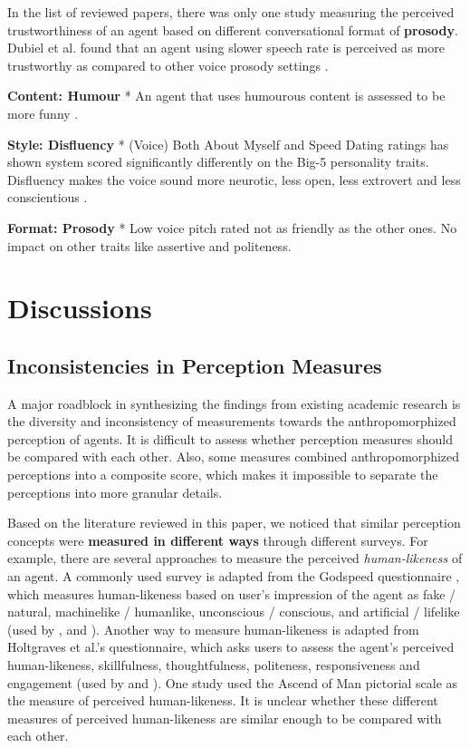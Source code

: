\documentclass[sigconf,screen,review, anonymous]{acmart}
\newcommand{\cmt}[1]{}%
\begin{document}
In the list of reviewed papers, there was only one study measuring the perceived trustworthiness of an agent based on different conversational format of \textbf{prosody}. Dubiel et al. found that an agent using slower speech rate is perceived as more trustworthy as compared to other voice prosody settings \cite{dubiel2020persuasive}\cmt{[60]}.

\textbf{Content: Humour}
* An agent that uses humourous content is assessed to be more funny \cite{khooshabeh2011does}\cmt{[37]}.

\textbf{Style: Disfluency}
* (Voice) Both About Myself and Speed Dating ratings has shown system scored significantly differently on the Big-5 personality traits. Disfluency makes the voice sound more neurotic, less open, less extrovert and less conscientious \cite{wester2015artificial}\cmt{[14]}.

\textbf{Format: Prosody}
* Low voice pitch rated not as friendly as the other ones. No impact on other traits like assertive and politeness. \cite{cambre2019one}\cmt{[62]}

\section{Discussions}

\subsection{Inconsistencies in Perception Measures}

A major roadblock in synthesizing the findings from existing academic research is the diversity and inconsistency of measurements towards the anthropomorphized perception of agents. It is difficult to assess whether perception measures should be compared with each other. Also, some measures combined anthropomorphized perceptions into a composite score, which makes it impossible to separate the perceptions into more granular details.

Based on the literature reviewed in this paper, we noticed that similar perception concepts were \textbf{measured in different ways} through different surveys. For example, there are several approaches to measure the perceived \textit{human-likeness} of an agent. A commonly used survey is adapted from the Godspeed questionnaire \cite{bartneck2009measurement}, which measures human-likeness based on user's impression of the agent as fake / natural, machinelike / humanlike, unconscious / conscious, and artificial / lifelike (used by \cite{hoegen2019end}\cmt{[31]}, \cite{jeong2019exploring}\cmt{[10]} and \cite{ouchi2019should}\cmt{[59]}). Another way to measure human-likeness is adapted from Holtgraves et al.'s \cite{holtgraves2007perceiving} questionnaire, which asks users to assess the agent's perceived human-likeness, skillfulness, thoughtfulness, politeness, responsiveness and engagement (used by \cite{diederich2019emulating}\cmt{[25]} and  \cite{gnewuch2018faster}\cmt{[19]}). One study \cite{westerman2019believe}\cmt{[9]} used the Ascend of Man pictorial scale \cite{kteily2015ascent} as the measure of perceived human-likeness. It is unclear whether these different measures of perceived human-likeness are similar enough to be compared with each other.
\end{document}

